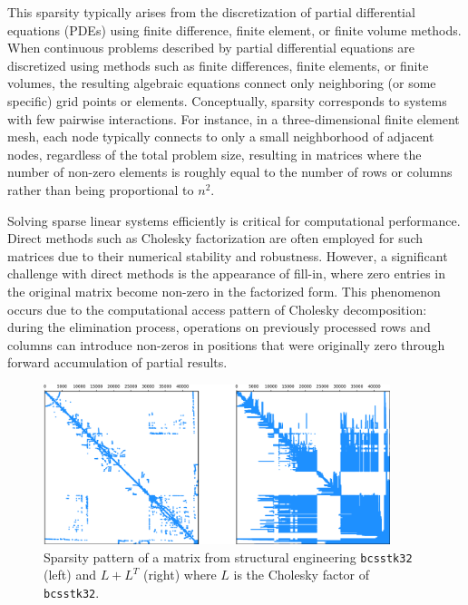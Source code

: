  This sparsity typically arises from the discretization of partial differential equations (PDEs) \cite{schaeffer_sparse_2013} using finite difference, finite element, or finite volume methods. When continuous problems described by partial differential equations are discretized using methods such as finite differences, finite elements, or finite volumes, the resulting algebraic equations connect only neighboring (or some specific) grid points or elements. Conceptually, sparsity corresponds to systems with few pairwise interactions. For instance, in a three-dimensional finite element mesh, each node typically connects to only a small neighborhood of adjacent nodes, regardless of the total problem size, resulting in matrices where the number of non-zero elements is roughly equal to the number of rows or columns rather than being proportional to $n^2$.

Solving sparse linear systems efficiently is critical for computational performance. Direct methods such as Cholesky factorization are often employed for such matrices due to their numerical stability and robustness. However, a significant challenge with direct methods is the appearance of fill-in, where zero entries in the original matrix become non-zero in the factorized form. This phenomenon occurs due to the computational access pattern of Cholesky decomposition: during the elimination process, operations on previously processed rows and columns can introduce non-zeros in positions that were originally zero through forward accumulation of partial results.

\begin{figure}[!h]
    \centering
    \includegraphics[width=0.9\textwidth]{fig/intro/sparsity_pattern.png}
    \caption{Sparsity pattern of a matrix from structural engineering \texttt{bcsstk32} (left) and \(L+L^T\) (right) where \(L\) is the Cholesky factor of \texttt{bcsstk32}.}
    \label{fig:sparse-matrix-example}
\end{figure}

